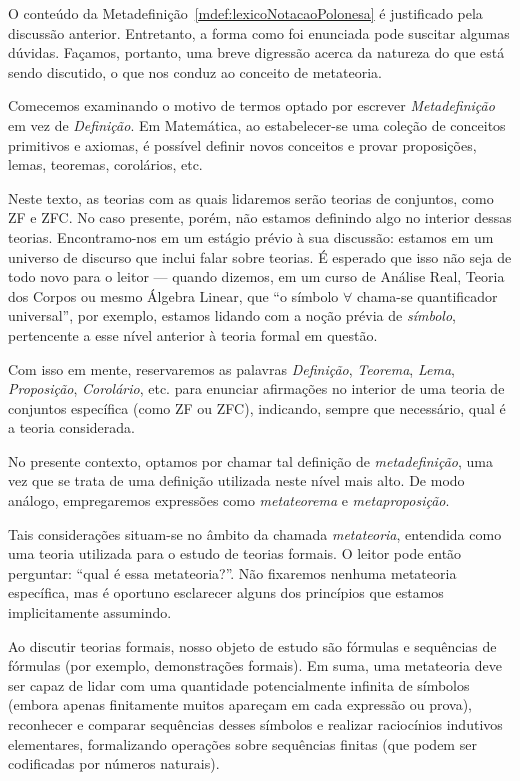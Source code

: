 O conteúdo da Metadefinição~\ref{mdef:lexicoNotacaoPolonesa} é justificado pela discussão anterior.
Entretanto, a forma como foi enunciada pode suscitar algumas dúvidas.
Façamos, portanto, uma breve digressão acerca da natureza do que está sendo discutido, o que nos conduz ao conceito de metateoria.

Comecemos examinando o motivo de termos optado por escrever \emph{Metadefinição} em vez de \emph{Definição}.
Em Matemática, ao estabelecer-se uma coleção de conceitos primitivos e axiomas, é possível definir novos conceitos e provar proposições, lemas, teoremas, corolários, etc.

Neste texto, as teorias com as quais lidaremos serão teorias de conjuntos, como ZF e ZFC.
No caso presente, porém, não estamos definindo algo no interior dessas teorias.
Encontramo-nos em um estágio prévio à sua discussão: estamos em um universo de discurso que inclui falar sobre teorias.
É esperado que isso não seja de todo novo para o leitor --- quando dizemos, em um curso de Análise Real, Teoria dos Corpos ou mesmo Álgebra Linear, que ``o símbolo $\forall$ chama-se quantificador universal'', por exemplo, estamos lidando com a noção prévia de \emph{símbolo}, pertencente a esse nível anterior à teoria formal em questão.

Com isso em mente, reservaremos as palavras \emph{Definição}, \emph{Teorema}, \emph{Lema}, \emph{Proposição}, \emph{Corolário}, etc. para enunciar afirmações no interior de uma teoria de conjuntos específica (como ZF ou ZFC), indicando, sempre que necessário, qual é a teoria considerada.

No presente contexto, optamos por chamar tal definição de \emph{metadefinição}, uma vez que se trata de uma definição utilizada neste nível mais alto.
De modo análogo, empregaremos expressões como \emph{metateorema} e \emph{metaproposição}.

Tais considerações situam-se no âmbito da chamada \emph{metateoria}, entendida como uma teoria utilizada para o estudo de teorias formais.
O leitor pode então perguntar: ``qual é essa metateoria?''.
Não fixaremos nenhuma metateoria específica, mas é oportuno esclarecer alguns dos princípios que estamos implicitamente assumindo.

Ao discutir teorias formais, nosso objeto de estudo são fórmulas e sequências de fórmulas (por exemplo, demonstrações formais).
Em suma, uma metateoria deve ser capaz de lidar com uma quantidade potencialmente infinita de símbolos (embora apenas finitamente muitos apareçam em cada expressão ou prova), reconhecer e comparar sequências desses símbolos e realizar raciocínios indutivos elementares, formalizando operações sobre sequências finitas (que podem ser codificadas por números naturais).

